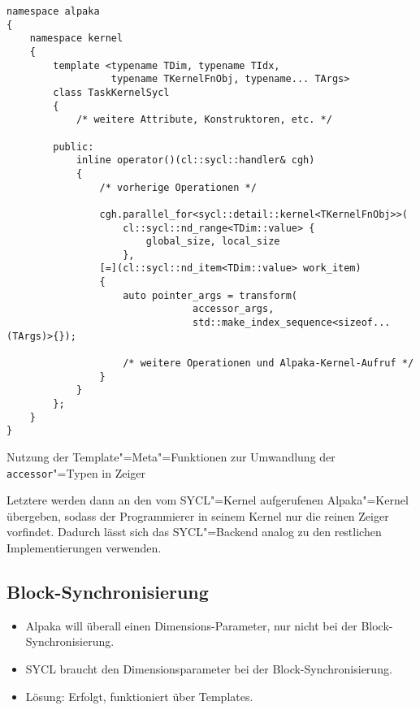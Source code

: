\begin{code}
    \begin{verbatim}
namespace alpaka
{
    namespace kernel
    {
        template <typename TDim, typename TIdx,
                  typename TKernelFnObj, typename... TArgs>
        class TaskKernelSycl
        {
            /* weitere Attribute, Konstruktoren, etc. */

        public:
            inline operator()(cl::sycl::handler& cgh)
            {
                /* vorherige Operationen */

                cgh.parallel_for<sycl::detail::kernel<TKernelFnObj>>(
                    cl::sycl::nd_range<TDim::value> {
                        global_size, local_size
                    },
                [=](cl::sycl::nd_item<TDim::value> work_item)
                {
                    auto pointer_args = transform(
                                accessor_args,
                                std::make_index_sequence<sizeof...(TArgs)>{});

                    /* weitere Operationen und Alpaka-Kernel-Aufruf */
                }
            }
        };
    }
}
    \end{verbatim}
    \caption{Nutzung der Template"=Meta"=Funktionen zur Umwandlung der
             \texttt{accessor}"=Typen in Zeiger}
    \label{implementierung:besonderheiten:zeiger:acctransusage}
\end{code}
Letztere werden dann an den vom SYCL"=Kernel aufgerufenen
Alpaka"=Kernel übergeben, sodass der Programmierer in seinem Kernel nur die
reinen Zeiger vorfindet. Dadurch lässt sich das SYCL"=Backend analog zu den
restlichen Implementierungen verwenden.

\subsection{Block-Synchronisierung}
\label{implementierung:besonderheiten:synchronisierung}

\begin{itemize}
    \item Alpaka will überall einen Dimensions-Parameter, nur nicht bei der
          Block-Synchronisierung.
    \item SYCL braucht den Dimensionsparameter bei der Block-Synchronisierung.
    \item Lösung: Erfolgt, funktioniert über Templates.
\end{itemize}

